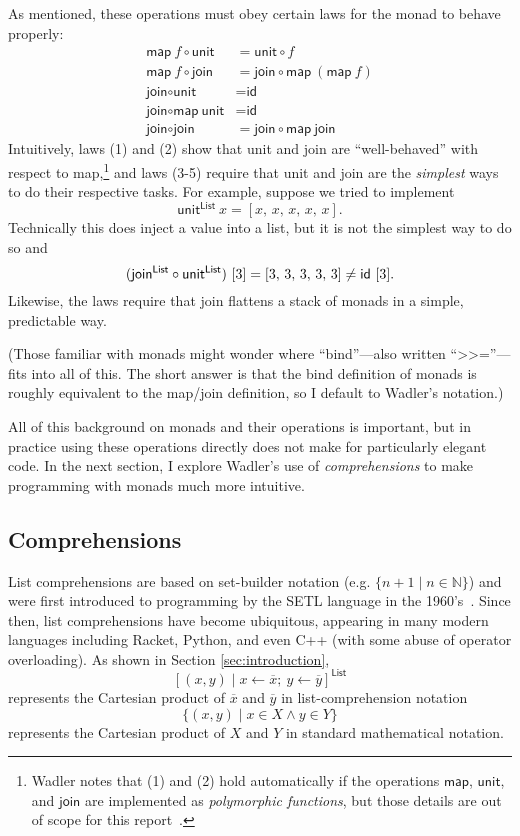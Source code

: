 \documentclass[acmsmall, nonacm, screen]{acmart}
\newcommand{\unit}[2]{\textsf{unit}^{\textsf{#1}}~#2}
\begin{document}
As mentioned, these operations must obey certain laws for the monad to behave properly:
\begin{align}
  \textsf{map}~f \circ \textsf{unit} &= \textsf{unit} \circ f \\
  \textsf{map}~f \circ \textsf{join} &= \textsf{join} \circ \textsf{map}~(\textsf{map}~f) \\
  \textsf{join} \circ \textsf{unit} &= \textsf{id} \\
  \textsf{join} \circ \textsf{map}~\textsf{unit} &= \textsf{id} \\
  \textsf{join} \circ \textsf{join} &= \textsf{join} \circ \textsf{map}~\textsf{join}
\end{align}
Intuitively, laws (1) and (2) show that \textsf{unit} and \textsf{join} are ``well-behaved'' with
respect to \textsf{map},\footnote{Wadler notes that (1) and (2) hold automatically if the
operations $\textsf{map}$, $\textsf{unit}$, and $\textsf{join}$ are implemented as {\em
polymorphic functions}, but those details are out of scope for this
report~\cite{wadler1989theorems}.} and laws (3-5) require that \textsf{unit} and \textsf{join}
are the {\em simplest} ways to do their respective tasks. For example, suppose we tried to implement
\[ \unit{List}{x} = [x,\, x,\, x,\, x,\, x]. \]
Technically this does inject a value into a list, but it is not the simplest way to do so and
\[
  (\textsf{join}^{\textsf{List}} \circ \textsf{unit}^{\textsf{List}})~[3] = [3,\, 3,\, 3,\, 3,\, 3] \neq \textsf{id}~[3]. \\
\]
Likewise, the laws require that \textsf{join} flattens a stack of monads in a simple, predictable
way.

(Those familiar with monads might wonder where ``\textsf{bind}''---also written
``\textsf{>>=}''---fits into all of this. The short answer is that the \textsf{bind} definition
of monads is roughly equivalent to the \textsf{map}/\textsf{join} definition, so I default to
Wadler's notation.)

All of this background on monads and their operations is important, but in practice using these
operations directly does not make for particularly elegant code. In the next section, I explore
Wadler's use of {\em comprehensions} to make programming with monads much more intuitive.

\subsection{Comprehensions}

List comprehensions are based on set-builder notation (e.g. $\{n + 1 \mid n \in \mathbb{N}\}$)
and were first introduced to programming by the SETL language in the
1960's~\cite{schwartz2012programming}. Since then, list comprehensions have become ubiquitous,
appearing in many modern languages including Racket, Python, and even C++ (with some abuse of
operator overloading). As shown in Section \ref{sec:introduction},
\[ [(x, y) \mid x \leftarrow \overline{x};\ y \leftarrow \overline{y}]^{\textsf{List}} \]
represents the Cartesian product of $\overline{x}$ and $\overline{y}$ in list-comprehension notation
\[ \{(x, y) \mid x \in X \wedge y \in Y\} \]
represents the Cartesian product of $X$ and $Y$ in standard mathematical notation.
\end{document}
